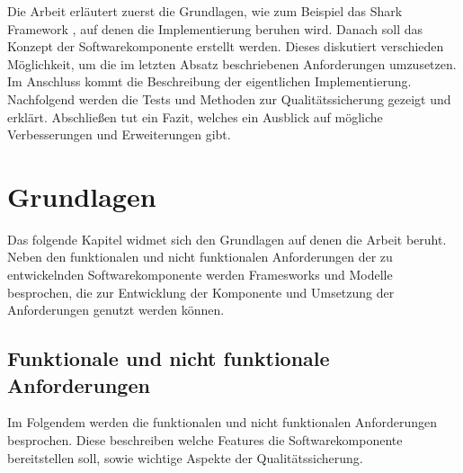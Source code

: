 \documentclass[a4paper]{article}
\begin{document}
	Die Arbeit erläutert zuerst die Grundlagen, wie zum Beispiel das Shark Framework
	\cite{SharkFW},	auf denen die Implementierung beruhen wird. 
	Danach soll das Konzept	der Softwarekomponente erstellt werden. Dieses diskutiert
	verschieden Möglichkeit, um die im letzten Absatz beschriebenen Anforderungen
	umzusetzen.	Im Anschluss kommt die Beschreibung der eigentlichen Implementierung.
	Nachfolgend werden die Tests und Methoden zur Qualitätssicherung gezeigt und
	erklärt. Abschließen tut ein Fazit, welches ein Ausblick auf mögliche
	Verbesserungen und Erweiterungen gibt.

	\newpage
	\section{Grundlagen}
	
	Das folgende Kapitel widmet sich den Grundlagen auf denen die Arbeit
	beruht. Neben den funktionalen und nicht funktionalen Anforderungen
	der zu entwickelnden Softwarekomponente werden Framesworks und Modelle
	besprochen, die zur Entwicklung der Komponente und Umsetzung der Anforderungen
	genutzt werden können. 
	
	\subsection{Funktionale und nicht funktionale Anforderungen}
	\label{sec:requirements}
	
	Im Folgendem werden die funktionalen und nicht funktionalen
	Anforderungen besprochen. Diese	beschreiben welche Features die
	Softwarekomponente bereitstellen soll, sowie wichtige Aspekte der
	Qualitätssicherung.
	
\end{document}
